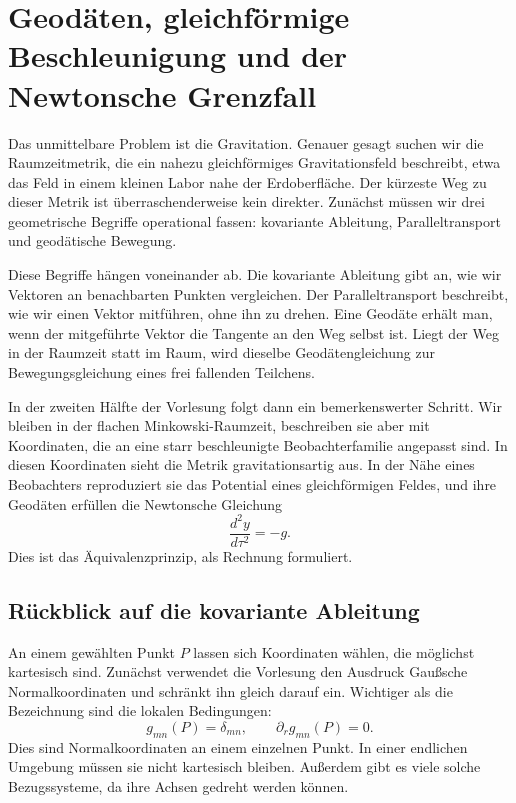 \chapter{Geodäten, gleichförmige Beschleunigung und der Newtonsche Grenzfall}

Das unmittelbare Problem ist die Gravitation. Genauer gesagt suchen wir die Raumzeitmetrik, die ein nahezu gleichförmiges Gravitationsfeld beschreibt, etwa das Feld in einem kleinen Labor nahe der Erdoberfläche. Der kürzeste Weg zu dieser Metrik ist überraschenderweise kein direkter. Zunächst müssen wir drei geometrische Begriffe operational fassen: kovariante Ableitung, Paralleltransport und geodätische Bewegung.

Diese Begriffe hängen voneinander ab. Die kovariante Ableitung gibt an, wie wir Vektoren an benachbarten Punkten vergleichen. Der Paralleltransport beschreibt, wie wir einen Vektor mitführen, ohne ihn zu drehen. Eine Geodäte erhält man, wenn der mitgeführte Vektor die Tangente an den Weg selbst ist. Liegt der Weg in der Raumzeit statt im Raum, wird dieselbe Geodätengleichung zur Bewegungsgleichung eines frei fallenden Teilchens.

In der zweiten Hälfte der Vorlesung folgt dann ein bemerkenswerter Schritt. Wir bleiben in der flachen Minkowski-Raumzeit, beschreiben sie aber mit Koordinaten, die an eine starr beschleunigte Beobachterfamilie angepasst sind. In diesen Koordinaten sieht die Metrik gravitationsartig aus. In der Nähe eines Beobachters reproduziert sie das Potential eines gleichförmigen Feldes, und ihre Geodäten erfüllen die Newtonsche Gleichung
\begin{equation}
\frac{d^2y}{d\tau^2}=-g.
\end{equation}
Dies ist das Äquivalenzprinzip, als Rechnung formuliert.

\section{Rückblick auf die kovariante Ableitung}

An einem gewählten Punkt \(P\) lassen sich Koordinaten wählen, die möglichst kartesisch sind. Zunächst verwendet die Vorlesung den Ausdruck Gaußsche Normalkoordinaten und schränkt ihn gleich darauf ein. Wichtiger als die Bezeichnung sind die lokalen Bedingungen:
\begin{equation}
g_{mn}(P)=\delta_{mn},
\qquad
\partial_r g_{mn}(P)=0.
\label{eq:l4-normal-point}
\end{equation}
Dies sind Normalkoordinaten an einem einzelnen Punkt. In einer endlichen Umgebung müssen sie nicht kartesisch bleiben. Außerdem gibt es viele solche Bezugssysteme, da ihre Achsen gedreht werden können.

